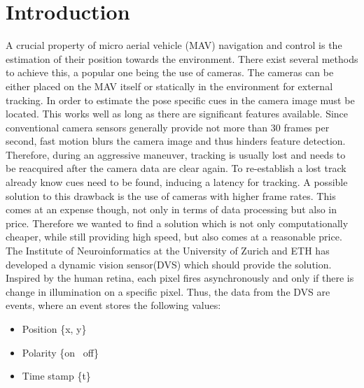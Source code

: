 \chapter{Introduction}\label{sec:introduction}

A crucial property of micro aerial vehicle (MAV) navigation and control is the estimation of their position towards the environment. There exist several methods to achieve this, a popular one being the use of cameras. The cameras can be either placed on the MAV itself or statically in the environment for external tracking. In order to estimate the pose specific cues in the camera image must be located. This works well as long as there are significant features available. Since conventional camera sensors generally provide not more than 30 frames per second, fast motion blurs the camera image and thus hinders feature detection.  Therefore, during an aggressive maneuver, tracking is usually lost and needs to be reacquired after the camera data are clear again. To re-establish a lost track already know cues need to be found, inducing a latency for tracking. A possible solution to this drawback is the use of cameras with higher frame rates. This comes at an expense though, not only in terms of data processing but also in price. Therefore we wanted to find a solution which is not only computationally cheaper, while still providing high speed, but also comes at a reasonable price.
The Institute of Neuroinformatics at the University of Zurich and ETH has developed a dynamic vision sensor(DVS) which should provide the solution. Inspired by the human retina, each pixel fires asynchronously and only if there is change in illumination on a specific pixel. Thus, the data from the DVS are events, where an event stores the following values:

\begin{itemize}
	\item Position \{x, y\}
	\item Polarity \{on \textbar\ off\}
	\item Time stamp \{t\}
\end{itemize}

